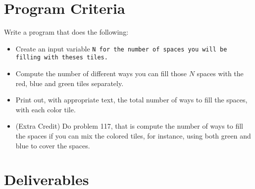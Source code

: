 \documentclass{article}
\def\prog#1{
\vspace{.1in}\begin{mdframed} \begin{center} \textbf{Programming Reminders} \end{center}#1 \end{mdframed} }
\begin{document}
	
	
 
 	
 	
 	
 	
 	
 	
 	

	
	
	
	
	
	
	
	




\section*{Program Criteria}
	Write a program that does the following:
	\begin{itemize}
		\item Create an input variable \tt{N} for the number of spaces you will be filling with theses tiles.
		\item Compute the number of different ways you can fill those $N$ spaces with the red, blue and green tiles separately.
		\item Print out, with appropriate text, the total number of ways to fill the spaces, with each color tile.
		\item (Extra Credit) Do problem 117, that is compute the number of ways to fill the spaces if you can mix the colored tiles, for instance, using both green and blue to cover the spaces.
	\end{itemize}







\section*{Deliverables}
	
\end{document}
